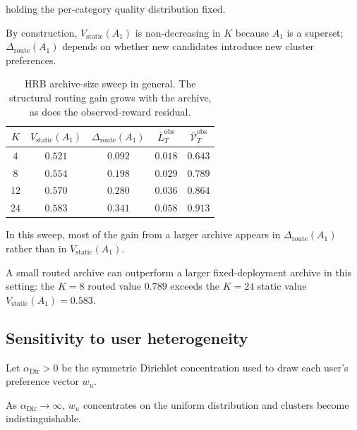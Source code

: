 \documentclass{article} %
\begin{document}
holding the per-category quality distribution fixed.

By construction, $V_{\mathrm{static}}(A_1)$ is non-decreasing in $K$ because $A_1$ is a superset; $\Delta_{\mathrm{route}}(A_1)$ depends on whether new candidates introduce new cluster preferences.

\begin{table}[h]
\centering
\small
\begin{tabular}{ccccc}
\toprule
$K$ & $V_{\mathrm{static}}(A_1)$ & $\Delta_{\mathrm{route}}(A_1)$ & $\bar L_T^{\mathrm{obs}}$ & $\bar{\mathcal V}_T^{\mathrm{obs}}$ \\
\midrule
$4$  & $0.521$ & $0.092$ & $0.018$ & $0.643$ \\
$8$  & $0.554$ & $0.198$ & $0.029$ & $0.789$ \\
$12$ & $0.570$ & $0.280$ & $0.036$ & $0.864$ \\
$24$ & $0.583$ & $0.341$ & $0.058$ & $0.913$ \\
\bottomrule
\end{tabular}
\caption{HRB archive-size sweep in general. The structural routing gain grows with
the archive, as does the observed-reward residual.}
\label{tab:app-K-sweep}
\end{table}

In this sweep, most of the gain from a larger archive appears in $\Delta_{\mathrm{route}}(A_1)$ rather than in $V_{\mathrm{static}}(A_1)$.

A small routed archive can outperform a larger fixed-deployment archive in this setting: the $K=8$ routed value $0.789$ exceeds the $K=24$ static value $V_{\mathrm{static}}(A_1)=0.583$.

\subsection{Sensitivity to user heterogeneity}

\label{app:dirichlet-sweep}

Let \(\alpha_{\mathrm{Dir}}>0\) be the symmetric Dirichlet concentration used
to draw each user's preference vector \(w_u\).

As \(\alpha_{\mathrm{Dir}}\to\infty\), \(w_u\) concentrates on the uniform
distribution and clusters become indistinguishable.
\end{document}
